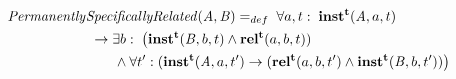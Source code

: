\begin{equation}
\begin{split}
\mathit{Permanently}&\mathit{SpecificallyRelated}(\mathit{A},\mathit{B}) =_{def}\;
\forall a, t:\; \mathrm{\mathbf{inst^t}}(\mathit{A}, a, t) \\
&\ \rightarrow
\exists b:\;\big(\mathrm{\mathbf{inst^t}}(\mathit{B},b,t) \wedge
\mathrm{\mathbf{rel^t}}(a,b,t))
\\
&\quad\quad \wedge \forall t^\prime: (\mathrm{\mathbf{inst^t}}(\mathit{A},a,t^\prime)
\rightarrow (\mathrm{\mathbf{rel^t}}(a,b,t^\prime) \wedge
\mathrm{\mathbf{inst^t}}(\mathit{B},b,t^\prime))\big)
\end{split}
\label{eq:specifically:cls}
\end{equation}

